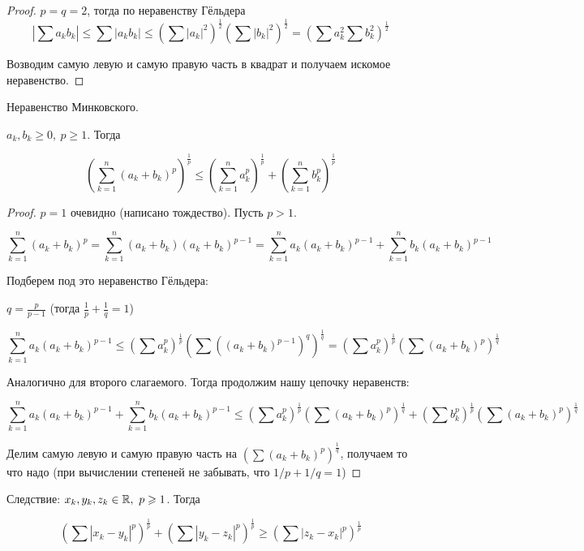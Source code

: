 \begin{proof}
    $p = q = 2$, тогда по неравенству Гёльдера
    \[ |\sum a_kb_k| \leqslant \sum|a_kb_k| \leqslant \left(\sum|a_k|^2\right)^\frac{1}{2} \left(\sum|b_k|^2\right)^\frac{1}{2} =
    \left(\sum a_k^2 \sum b_k^2\right)^\frac{1}{2}\]

    Возводим самую левую и самую правую часть в квадрат и получаем искомое неравенство.
\end{proof} 

\begin{theorem-non}
    Неравенство Минковского.

    $a_k, b_k \geqslant 0,\ p \geqslant 1$. Тогда

    \[ \left(\sum_{k=1}^{n}(a_k+b_k)^p\right)^\frac{1}{p} \leqslant \left(\sum_{k=1}^{n} a_k^p\right)^\frac{1}{p} +
    \left(\sum_{k=1}^{n} b_k^p\right)^\frac{1}{p} \]
\end{theorem-non}

\begin{proof}
    $p = 1$ очевидно (написано тождество). Пусть $p > 1$.

    \[ \sum_{k=1}^{n}(a_k+b_k)^p = \sum_{k=1}^{n}(a_k+b_k)(a_k+b_k)^{p-1} =
    \sum_{k=1}^{n} a_k(a_k+b_k)^{p-1} + \sum_{k=1}^{n} b_k(a_k+b_k)^{p-1} \]

    Подберем под это неравенство Гёльдера:

    $q = \frac{p}{p-1}$ (тогда $\frac{1}{p} + \frac{1}{q} = 1$)

    \[ \sum_{k=1}^{n} a_k(a_k+b_k)^{p-1} \leqslant \left( \sum a_k^p \right)^\frac{1}{p} \left( \sum ((a_k+b_k)^{p-1})^q \right)^\frac{1}{q}
    = \left( \sum a_k^p \right)^\frac{1}{p} \left( \sum (a_k+b_k)^p \right)^\frac{1}{q} \] 

    Аналогично для второго слагаемого. Тогда продолжим нашу цепочку неравенств:

    \[ \sum_{k=1}^{n} a_k(a_k+b_k)^{p-1} + \sum_{k=1}^{n} b_k(a_k+b_k)^{p-1} \leqslant
    \left( \sum a_k^p \right)^\frac{1}{p} \left( \sum (a_k+b_k)^p \right)^\frac{1}{q} + \left( \sum b_k^p \right)^\frac{1}{p} \left( \sum (a_k+b_k)^p \right)^\frac{1}{q} \]

    Делим самую левую и самую правую часть на $\left( \sum (a_k+b_k)^p \right)^\frac{1}{q}$, 
    получаем то что надо (при вычислении степеней не забывать, что $1/p + 1/q = 1$)


\end{proof}

\begin{theorem-non}
    Следствие: $x_k, y_k, z_k \in \mathbb{R},\ p \geqslant 1$. Тогда

    \[ \left( \sum |x_k-y_k|^p \right)^\frac{1}{p} + \left( \sum |y_k-z_k|^p \right)^\frac{1}{p} \geqslant
    \left( \sum |z_k-x_k|^p \right)^\frac{1}{p} \]
    
\end{theorem-non}

